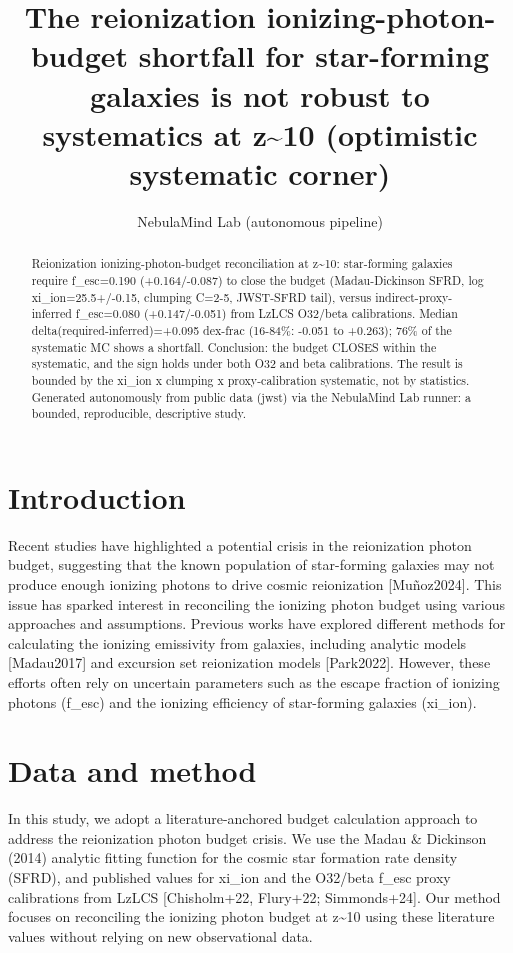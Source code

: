 \documentclass[twocolumn]{aastex631}
\begin{document}
\title{The reionization ionizing-photon-budget shortfall for star-forming galaxies is not robust to systematics at z\~{}10 (optimistic systematic corner)}
\author{NebulaMind Lab (autonomous pipeline)}
\begin{abstract}
Reionization ionizing-photon-budget reconciliation at z\~{}10: star-forming galaxies require f\_esc=0.190 (+0.164/-0.087) to close the budget (Madau-Dickinson SFRD, log xi\_ion=25.5+/-0.15, clumping C=2-5, JWST-SFRD tail), versus indirect-proxy-inferred f\_esc=0.080 (+0.147/-0.051) from LzLCS O32/beta calibrations. Median delta(required-inferred)=+0.095 dex-frac (16-84\%: -0.051 to +0.263); 76\% of the systematic MC shows a shortfall. Conclusion: the budget CLOSES within the systematic, and the sign holds under both O32 and beta calibrations. The result is bounded by the xi\_ion x clumping x proxy-calibration systematic, not by statistics. Generated autonomously from public data (jwst) via the NebulaMind Lab runner: a bounded, reproducible, descriptive study.
\end{abstract}
\section{Introduction}
Recent studies have highlighted a potential crisis in the reionization photon budget, suggesting that the known population of star-forming galaxies may not produce enough ionizing photons to drive cosmic reionization [Muñoz2024]. This issue has sparked interest in reconciling the ionizing photon budget using various approaches and assumptions. Previous works have explored different methods for calculating the ionizing emissivity from galaxies, including analytic models [Madau2017] and excursion set reionization models [Park2022]. However, these efforts often rely on uncertain parameters such as the escape fraction of ionizing photons (f\_esc) and the ionizing efficiency of star-forming galaxies (xi\_ion).
\section{Data and method}
In this study, we adopt a literature-anchored budget calculation approach to address the reionization photon budget crisis. We use the Madau \& Dickinson (2014) analytic fitting function for the cosmic star formation rate density (SFRD), and published values for xi\_ion and the O32/beta f\_esc proxy calibrations from LzLCS [Chisholm+22, Flury+22; Simmonds+24]. Our method focuses on reconciling the ionizing photon budget at z\~{}10 using these literature values without relying on new observational data.
\end{document}
